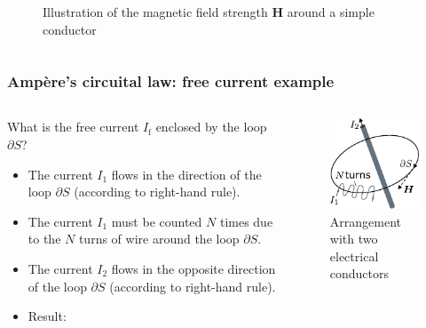 \begin{frame}
\begin{columns}
\begin{column}{0.4\textwidth}
\begin{figure}
				\caption{Illustration of the magnetic field strength $\bm{H}$ around a simple conductor}
			\end{figure}
		\end{column}
		\end{columns}
\end{frame}

\begin{frame}
	\frametitle{Amp\`ere's circuital law: free current example}
	\begin{columns}
		\begin{column}{0.55\textwidth}
			What is the free current $I_{\mathrm{f}}$ enclosed by the loop $\partial S$?
            \begin{itemize}
                \item<2-> The current $I_1$ flows in the direction of the loop $\partial S$ (according to right-hand rule).
                \item<3-> The current $I_1$ must be counted $N$ times due to the $N$ turns of wire around the loop $\partial S$.
                \item<4-> The current $I_2$ flows in the opposite direction of the loop $\partial S$ (according to right-hand rule).
                \item<5-> Result:
            \end{itemize}
            \vspace{0.25cm}
		\end{column}
        \hfill
		\begin{column}{0.45\textwidth}
			\begin{figure}
				\centering
				\includegraphics[height=0.5\textheight]{fig/lec02/Magnetic_field_strength_multiple_conductors.pdf}
				\caption{Arrangement with two electrical conductors}
			\end{figure}
		\end{column}
		\end{columns}
\end{frame}

